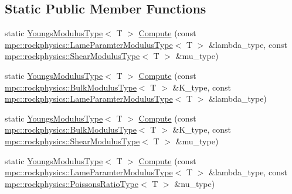 \subsection*{Static Public Member Functions}
\begin{DoxyCompactItemize}
\item 
static \mbox{\hyperlink{structmpc_1_1rockphysics_1_1_youngs_modulus_type}{Youngs\+Modulus\+Type}}$<$ T $>$ \mbox{\hyperlink{structmpc_1_1rockphysics_1_1_rock_physics_transforms_3_01_t_00_01mpc_1_1rockphysics_1_1_youngs_modulus_type_3_01_t_01_4_01_4_ae76cbcdd212d4ef682050511b802ddba}{Compute}} (const \mbox{\hyperlink{structmpc_1_1rockphysics_1_1_lame_paramter_modulus_type}{mpc\+::rockphysics\+::\+Lame\+Paramter\+Modulus\+Type}}$<$ T $>$ \&lambda\+\_\+type, const \mbox{\hyperlink{structmpc_1_1rockphysics_1_1_shear_modulus_type}{mpc\+::rockphysics\+::\+Shear\+Modulus\+Type}}$<$ T $>$ \&mu\+\_\+type)
\item 
static \mbox{\hyperlink{structmpc_1_1rockphysics_1_1_youngs_modulus_type}{Youngs\+Modulus\+Type}}$<$ T $>$ \mbox{\hyperlink{structmpc_1_1rockphysics_1_1_rock_physics_transforms_3_01_t_00_01mpc_1_1rockphysics_1_1_youngs_modulus_type_3_01_t_01_4_01_4_a4642c2d4d7a1d8f791802de9edcba714}{Compute}} (const \mbox{\hyperlink{structmpc_1_1rockphysics_1_1_bulk_modulus_type}{mpc\+::rockphysics\+::\+Bulk\+Modulus\+Type}}$<$ T $>$ \&K\+\_\+type, const \mbox{\hyperlink{structmpc_1_1rockphysics_1_1_lame_paramter_modulus_type}{mpc\+::rockphysics\+::\+Lame\+Paramter\+Modulus\+Type}}$<$ T $>$ \&lambda\+\_\+type)
\item 
static \mbox{\hyperlink{structmpc_1_1rockphysics_1_1_youngs_modulus_type}{Youngs\+Modulus\+Type}}$<$ T $>$ \mbox{\hyperlink{structmpc_1_1rockphysics_1_1_rock_physics_transforms_3_01_t_00_01mpc_1_1rockphysics_1_1_youngs_modulus_type_3_01_t_01_4_01_4_a174c797249b791733dbdf85437f31bc4}{Compute}} (const \mbox{\hyperlink{structmpc_1_1rockphysics_1_1_bulk_modulus_type}{mpc\+::rockphysics\+::\+Bulk\+Modulus\+Type}}$<$ T $>$ \&K\+\_\+type, const \mbox{\hyperlink{structmpc_1_1rockphysics_1_1_shear_modulus_type}{mpc\+::rockphysics\+::\+Shear\+Modulus\+Type}}$<$ T $>$ \&mu\+\_\+type)
\item 
static \mbox{\hyperlink{structmpc_1_1rockphysics_1_1_youngs_modulus_type}{Youngs\+Modulus\+Type}}$<$ T $>$ \mbox{\hyperlink{structmpc_1_1rockphysics_1_1_rock_physics_transforms_3_01_t_00_01mpc_1_1rockphysics_1_1_youngs_modulus_type_3_01_t_01_4_01_4_a6a0e6a8727dce17856729dce8f70a39f}{Compute}} (const \mbox{\hyperlink{structmpc_1_1rockphysics_1_1_lame_paramter_modulus_type}{mpc\+::rockphysics\+::\+Lame\+Paramter\+Modulus\+Type}}$<$ T $>$ \&lambda\+\_\+type, const \mbox{\hyperlink{structmpc_1_1rockphysics_1_1_poissons_ratio_type}{mpc\+::rockphysics\+::\+Poissons\+Ratio\+Type}}$<$ T $>$ \&nu\+\_\+type)

\end{DoxyCompactItemize}
